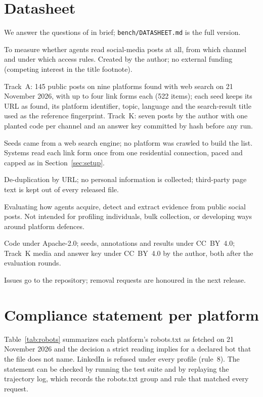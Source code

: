 \documentclass[11pt]{article}
\begin{document}
\section{Datasheet}\label{app:datasheet}
We answer the questions of \citet{gebru2021datasheets} in brief; \texttt{bench/DATASHEET.md} is the full version.
\begin{description}[leftmargin=1em, style=nextline]
\item[Motivation.] To measure whether agents read social-media posts at all, from which channel and under which
  access rules. Created by the author; no external funding (competing interest in the title footnote).
\item[Composition.] Track~A: 145 public posts on nine platforms found with web search on 21 November 2026, with up
  to four link forms each (522 items); each seed keeps its URL as found, its platform identifier, topic, language
  and the search-result title used as the reference fingerprint. Track~K: seven posts by the author with one
  planted code per channel and an answer key committed by hash before any run.
\item[Collection.] Seeds came from a web search engine; no platform was crawled to build the list. Systems read
  each link form once from one residential connection, paced and capped as in Section~\ref{sec:setup}.
\item[Preprocessing.] De-duplication by URL; no personal information is collected; third-party page text is kept
  out of every released file.
\item[Uses.] Evaluating how agents acquire, detect and extract evidence from public social posts. Not intended for
  profiling individuals, bulk collection, or developing ways around platform defences.
\item[Distribution.] Code under Apache-2.0; seeds, annotations and results under CC~BY~4.0; Track~K media and
  answer key under CC~BY~4.0 by the author, both after the evaluation rounds.
\item[Maintenance.] Issues go to the repository; removal requests are honoured in the next release.
\end{description}

\section{Compliance statement per platform}\label{app:compliance}
Table~\ref{tab:robots} summarizes each platform's robots.txt as fetched on 21 November 2026 and the decision a
strict reading implies for a declared bot that the file does not name. LinkedIn is refused under every profile
(rule~8). The statement can be checked by running the test suite and by replaying the trajectory log, which
records the robots.txt group and rule that matched every request.
\end{document}
